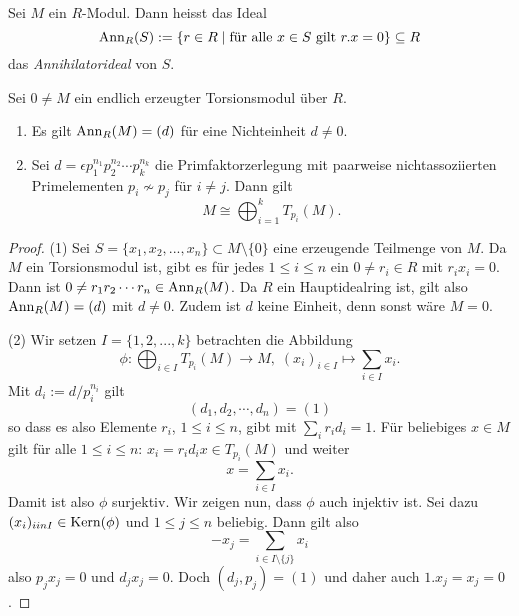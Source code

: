 \documentclass{book}
\begin{document}
\begin{defi}
    \label{defi:ann} Sei $M$ ein $R$-Modul. 
            Dann heisst das Ideal
            \[
                \operatorname{Ann}_R(S) := \{ r \in R\;|\; \text{für alle $x \in S$ gilt $r.x = 0$}\} \subseteq R
            \]
            das \emph{Annihilatorideal} von $S$.
\end{defi}

\begin{prop}
    \label{prop:torfin}
    Sei $0 \ne M$ ein endlich erzeugter Torsionsmodul über $R$. 
    \begin{enumerate}
        \item Es gilt $\operatorname{Ann}_R(M) = (d)$ für eine Nichteinheit $d \ne 0$. 
        \item Sei $d = \epsilon p_1^{n_1} p_2^{n_2} \cdots p_k^{n_k}$ die
            Primfaktorzerlegung mit paarweise nichtassoziierten Primelementen
            $p_i \not \sim p_j$ für $i \ne j$. Dann gilt
            \[
                M \cong \bigoplus_{i = 1}^k T_{p_i}(M).
            \]
    \end{enumerate}
\end{prop}
\begin{proof}
    (1) Sei $S= \{x_1, x_2, ..., x_n\} \subset M \setminus \{0\}$ eine
    erzeugende Teilmenge von $M$. Da $M$ ein Torsionsmodul ist, gibt es für
    jedes $1 \le i \le n$ ein $0 \ne r_i \in R$ mit $r_i x_i = 0$. Dann ist $0 \ne r_1 r_2 \cdots r_n \in
    \operatorname{Ann}_R(M)$. Da $R$ ein Hauptidealring ist, gilt also $\operatorname{Ann}_R(M) = (d)$ mit
    $d \ne 0$. Zudem ist $d$ keine Einheit, denn sonst wäre $M = 0$. 

    (2) Wir setzen $I = \{1,2,...,k\}$ betrachten die Abbildung
    \[
        \phi: \bigoplus_{i \in I} T_{p_i}(M) \to M, \; (x_i)_{i \in I} \mapsto \sum_{i \in I} x_i.
    \]
    Mit $d_i := d/p_i^{n_i}$ gilt
    \[
        (d_1, d_2, \cdots, d_n) = (1)
    \]
    so dass es also Elemente $r_i$, $1 \le i \le n$, gibt mit $\sum_i r_i d_i = 1$. Für
    beliebiges $x \in M$ gilt für alle $1 \le i \le n$: $x_i = r_i d_i x \in T_{p_i}(M)$ und weiter
    \[
        x = \sum_{i \in I} x_i.
    \]
    Damit ist also $\phi$ surjektiv. Wir zeigen nun, dass $\phi$ auch injektiv
    ist. Sei dazu $(x_i)_{i in I} \in \Kern(\phi)$ und $1 \le j \le n$ beliebig. Dann gilt
    also
    \[
        -x_j = \sum_{i \in I \setminus \{j\} } x_i
    \]
    also $p_j x_j = 0$ und $d_j x_j = 0$. Doch $(d_j,p_j) = (1)$ und daher
    auch $1.x_j = x_j = 0$. 
\end{proof}
\end{document}
